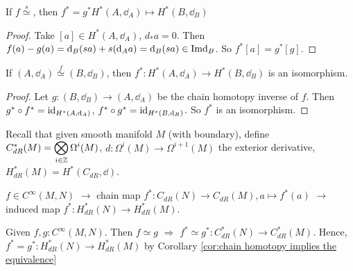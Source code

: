
\begin{lemma}
    If  $ f\overset{s }{\simeq} $, then  $ f^*=g^* H^*(A,\dd_A)\mapsto H^*(B,\dd_B) $  
\end{lemma}
\begin{proof}
    Take  $ [a]\in H^*(A,\dd_A) $,  $ d_*a =0 $. Then  $ f(a)-g(a)=\mathrm{d}_B(sa)+s(\mathrm{d}_A a)=\mathrm{d}_B(sa)\in \mathrm{Im} \mathrm{d}_B $. So  $ f^*[a]=g^*[g] $.    
\end{proof}

\begin{corollary}\label{cor:chain homotopy implies the equivalence}
    If  $ (A,\dd_A)\overset{f}{\simeq}(B,\dd_B) $, then  $ f^*:H^*(A,\dd_A)\rightarrow H^*(B,\dd_B) $ is an isomorphism.  
\end{corollary}
\begin{proof}
    Let  $ g:(B,\dd_B)\rightarrow (A,\dd_A) $ be the chain homotopy inverse of  $ f $. Then  $ g^*\circ f^*=\mathrm{id}_{H^*(A,\mathrm{d}_A)} $,  $ f^*\circ g^*=\mathrm{id}_{H^*(B,\mathrm{d}_B)} $. So  $ f^* $  is an isomorphism.    
\end{proof}

Recall that given smooth manifold $ M  $ (with boundary), define  $ C_{dR}^*(M)=\displaystyle\bigotimes_{i\in \mathbb Z}\Omega^i(M) $,  $ d:\Omega^i(M)\rightarrow \Omega^{i+1}(M) $ the exterior derivative,  $ H^*_{dR}(M)=H^*(C_{dR},\dd) $.  

$ f\in C^{\infty}(M,N) $ $ \rightarrow  $ chain map   $ f^*:C_{dR}(N)\rightarrow C_{dR}(M),a\mapsto f^*(a) $      $ \rightarrow  $ induced map  $ f^*:H^*_{dR}(N)\rightarrow H^*_{dR}(M) $.

\begin{theorem}\label{thm:theorem A}
    Given  $ f, g:C^\infty(M,N ) $. Then  $ f\simeq g  $  $ \Rightarrow  $  $ f^*\simeq g^*:C_{dR}^*(N)\rightarrow C_{dR}^*(M) $. Hence,   $ f^*=g^*:H^*_{dR}(N)\rightarrow H^*_{dR}(M) $ by Corollary  \ref{cor:chain homotopy implies the equivalence}
\end{theorem}

